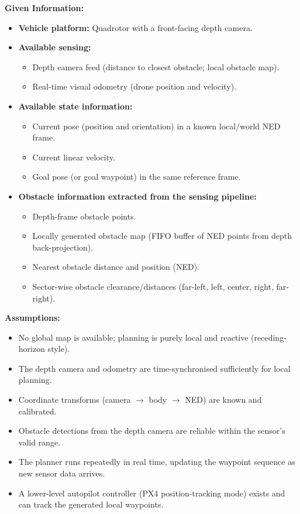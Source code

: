 \documentclass[12pt]{article}
\begin{document}
\noindent\textbf{Given Information:}
\begin{itemize}
  \item \textbf{Vehicle platform:} Quadrotor with a front-facing depth camera.
  \item \textbf{Available sensing:}
    \begin{itemize}
      \item Depth camera feed (distance to closest obstacle; local obstacle map).
      \item Real-time visual odometry (drone position and velocity).
    \end{itemize}
  \item \textbf{Available state information:}
    \begin{itemize}
      \item Current pose (position and orientation) in a known local/world NED frame.
      \item Current linear velocity.
      \item Goal pose (or goal waypoint) in the same reference frame.
    \end{itemize}
  \item \textbf{Obstacle information extracted from the sensing pipeline:}
    \begin{itemize}
      \item Depth-frame obstacle points.
      \item Locally generated obstacle map (FIFO buffer of NED points from depth
        back-projection).
      \item Nearest obstacle distance and position (NED).
      \item Sector-wise obstacle clearance/distances (far-left, left, center, right, far-right).
    \end{itemize}
\end{itemize}

\noindent\textbf{Assumptions:}
\begin{itemize}
  \item No global map is available; planning is purely local and reactive
    (receding-horizon style).
  \item The depth camera and odometry are time-synchronised sufficiently for local planning.
  \item Coordinate transforms (camera $\to$ body $\to$ NED) are known and calibrated.
  \item Obstacle detections from the depth camera are reliable within the sensor's valid range.
  \item The planner runs repeatedly in real time, updating the waypoint sequence as new sensor
    data arrives.
  \item A lower-level autopilot controller (PX4 position-tracking mode) exists and can track
    the generated local waypoints.
\end{itemize}
\end{document}
